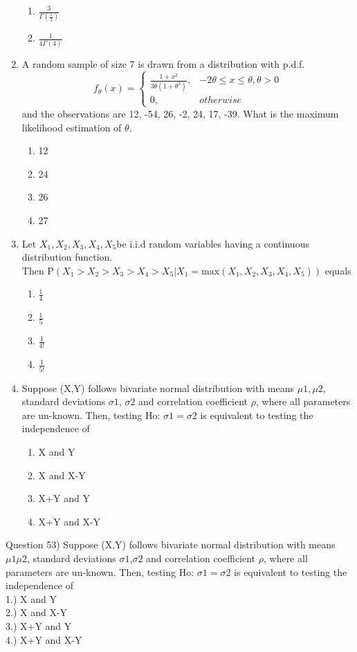 \documentclass[journal,12pt,twocolumn]{IEEEtran}
\begin{document}
\begin{enumerate}[label=\arabic*.,ref=\theenumi]
\begin{enumerate}
\item $\frac{3}{\Gamma (\frac{1}{3})}$
\item $\frac{1}{4\Gamma(4) }$
\end{enumerate}
\item A random sample of size 7 is drawn from a distribution with p.d.f. \\ 
\[
    f_\theta(x)= 
\begin{cases}
\frac{1 + x^2}{3\theta(1+\theta^2)},& -2\theta \leq x \leq \theta, \theta > 0\\
    0,              & otherwise
\end{cases}
\]
and the observations are 12, -54, 26, -2, 24, 17, -39. What is the maximum likelihood estimation of \(\theta\).
\begin{enumerate}
\item 12
\item 24
\item 26
\item 27
\end{enumerate}
\item Let $X_1, X_2, X_3, X_4, X_5 $be i.i.d random variables having a continuous distribution function. $\text {Then P}(X_1>X_2>X_3>X_4>X_5|X_1 = \text {max}(X_1,X_2,X_3,X_4,X_5))$ equals
\begin{enumerate}
\item $\displaystyle\frac{1}{4}$
\item $\displaystyle\frac{1}{5}$
\item $\displaystyle\frac{1}{4!}$
\item $\displaystyle\frac{1}{5!}$
\end{enumerate}
\item Suppose (X,Y) follows bivariate normal distribution with means $\mu1, \mu2$, standard deviations $\sigma1$, $\sigma2$ and correlation coefficient $\rho$, where all parameters are un-known. Then, testing Ho: $\sigma1=\sigma2$ is equivalent to testing the independence of  
\begin{enumerate}
\item X and Y 
\item X and X-Y  
\item X+Y and Y 
\item X+Y and X-Y 
\end{enumerate}
\end{enumerate}
Question 53) Suppose (X,Y) follows bivariate normal distribution with means $\mu1  \mu2$, standard deviations $\sigma1$,$\sigma2$ and correlation coefficient $\rho$, where all parameters are un-known. Then, testing Ho: $\sigma1=\sigma2$ is equivalent to testing the independence of  
\\
1.) X and Y \\
2.) X and X-Y \\
3.) X+Y and Y \\
4.) X+Y and X-Y \\
\end{document}
